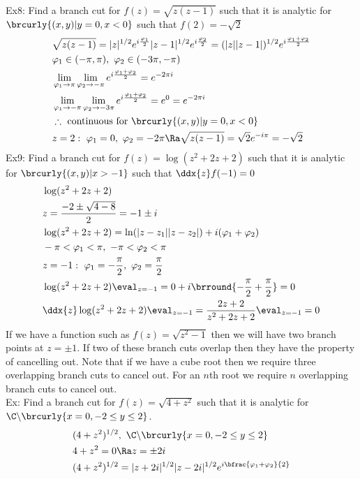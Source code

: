 Ex8: Find a branch cut for $f(z)=\sqrt{z(z-1)}$ such that it is analytic for $\brcurly{(x,y)|y=0,x<0}$ such that $f(2)=-\sqrt{2}$
\begin{align*}
    &\sqrt{z(z-1)}=|z|^{1/2}e^{i\frac{\varphi_1}{2}}|z-1|^{1/2}e^{i\frac{\varphi_2}{2}}=(|z||z-1|)^{1/2}e^{i\frac{\varphi_1+\varphi_2}{2}}\\
    &\varphi_1\in(-\pi,\pi),\ \varphi_2\in(-3\pi,-\pi)\\
    &\lim_{\varphi_1\to\pi}\lim_{\varphi_2\to-\pi}e^{i\frac{\varphi_1+\varphi_2}{2}}=e^{-2\pi i}\\
    &\lim_{\varphi_1\to-\pi}\lim_{\varphi_2\to-3\pi}e^{i\frac{\varphi_1+\varphi_2}{2}}=e^{0}=e^{-2\pi i}\\
    &\therefore \text{ continuous for }\brcurly{(x,y)|y=0,x<0}\\
    &z=2:\ \varphi_1=0,\ \varphi_2=-2\pi\Ra \sqrt{z(z-1)}=\sqrt{2}e^{-i\pi}=-\sqrt{2}
\end{align*}
Ex9: Find a branch cut for $f(z)=\log(z^2+2z+2)$ such that it is analytic for $\brcurly{(x,y)|x>-1}$ such that $\ddx{z}f(-1)=0$
\begin{align*}
    &\log(z^2+2z+2)\\
    &z=\frac{-2\pm\sqrt{4-8}}{2}=-1\pm i\\
    &\log(z^2+2z+2)=\ln(|z-z_1||z-z_2|)+i(\varphi_1+\varphi_2)\\
    &-\pi<\varphi_1<\pi,\ -\pi<\varphi_2<\pi\\
    &z=-1:\ \varphi_1=-\frac{\pi}{2},\ \varphi_2=\frac{\pi}{2}\\
    &\log(z^2+2z+2)\eval_{z=-1}=0+i\brround{-\frac{\pi}{2}+\frac{\pi}{2}}=0\\
    &\ddx{z}\log(z^2+2z+2)\eval_{z=-1}=\frac{2z+2}{z^2+2z+2}\eval_{z=-1}=0
\end{align*}
If we have a function such as $f(z)=\sqrt{z^2-1}$ then we will have two branch points at $z=\pm1$. If two of these branch cuts overlap then they have the property of cancelling out. Note that if we have a cube root then we require three overlapping branch cuts to cancel out. For an $n$th root we require $n$ overlapping branch cuts to cancel out.\\
Ex: Find a branch cut for $f(z)=\sqrt{4+z^2}$ such that it is analytic for $\C\backslash\brcurly{x=0,-2\leq y\leq 2}$.
\begin{align*}
    &(4+z^2)^{1/2},\ \C\backslash\brcurly{x=0,-2\leq y\leq 2}\\
    &4+z^2=0\Ra z=\pm2i\\
    &(4+z^2)^{1/2}=|z+2i|^{1/2}|z-2i|^{1/2}e^{i\bfrac{\varphi_1+\varphi_2}{2}}
\end{align*}
